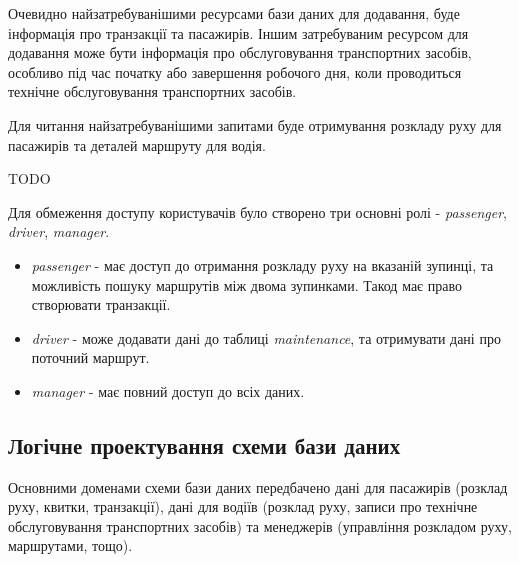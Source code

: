 \documentclass[oneside,14pt]{extarticle}
\begin{document}
Очевидно найзатребуванішими ресурсами бази даних для додавання, буде інформація про транзакції та пасажирів. Іншим затребуваним ресурсом для додавання може бути інформація про обслуговування транспортних засобів, особливо під час початку або завершення робочого дня, коли проводиться технічне обслуговування транспортних засобів.

Для читання найзатребуванішими запитами буде отримування розкладу руху для пасажирів та деталей маршруту для водія.

TODO

Для обмеження доступу користувачів було створено три основні ролі - \textit{passenger}, \textit{driver}, \textit{manager}.

\begin{itemize}
\item \textit{passenger} - має доступ до отримання розкладу руху на вказаній зупинці, та можливість пошуку маршрутів між двома зупинками. Такод має право створювати транзакції.
\item \textit{driver} - може додавати дані до таблиці \textit{maintenance}, та отримувати дані про поточний маршрут.
\item \textit{manager} - має повний доступ до всіх даних.
\end{itemize}

\subsection{Логічне проектування схеми бази даних}
Основними доменами схеми бази даних передбачено дані для пасажирів (розклад руху, квитки, транзакції), дані для водіїв (розклад руху, записи про технічне обслуговування транспортних засобів) та менеджерів (управління розкладом руху, маршрутами, тощо).
\end{document}
